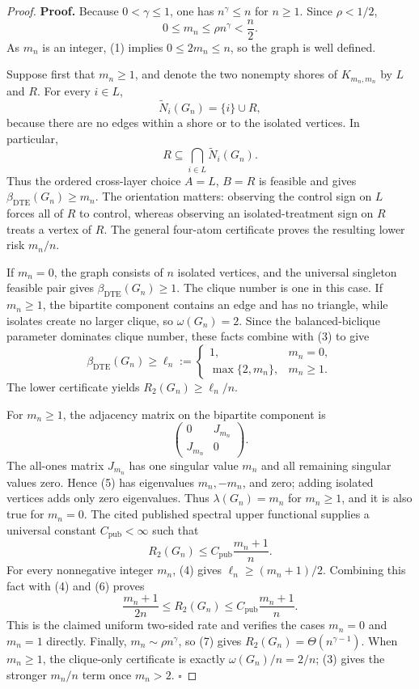 \documentclass{article}
\begin{document}
\begin{proof}
\textbf{Proof.}
Because \(0<\gamma\leq1\), one has \(n^{\gamma}\leq n\) for \(n\geq1\).  Since \(\rho<1/2\),
\[
0\leq m_n\leq\rho n^{\gamma}<\frac n2.
\tag{1}
\]
As \(m_n\) is an integer, (1) implies \(0\leq2m_n\leq n\), so the graph is well defined.

Suppose first that \(m_n\geq1\), and denote the two nonempty shores of \(K_{m_n,m_n}\) by \(L\) and \(R\).  For every \(i\in L\),
\[
\widetilde N_i(G_n)=\{i\}\cup R,
\tag{2}
\]
because there are no edges within a shore or to the isolated vertices.  In particular,
\[
R\subseteq\bigcap_{i\in L}\widetilde N_i(G_n).
\tag{3}
\]
Thus the ordered cross-layer choice \(A=L\), \(B=R\) is feasible and gives \(\beta_{\mathrm{DTE}}(G_n)\geq m_n\).  The orientation matters: observing the control sign on \(L\) forces all of \(R\) to control, whereas observing an isolated-treatment sign on \(R\) treats a vertex of \(R\).  The general four-atom certificate proves the resulting lower risk \(m_n/n\).

If \(m_n=0\), the graph consists of \(n\) isolated vertices, and the universal singleton feasible pair gives \(\beta_{\mathrm{DTE}}(G_n)\geq1\).  The clique number is one in this case.  If \(m_n\geq1\), the bipartite component contains an edge and has no triangle, while isolates create no larger clique, so \(\omega(G_n)=2\).  Since the balanced-biclique parameter dominates clique number, these facts combine with (3) to give
\[
\beta_{\mathrm{DTE}}(G_n)\geq
\ell_n:=
\begin{cases}
1,&m_n=0,\\
\max\{2,m_n\},&m_n\geq1.
\end{cases}
\tag{4}
\]
The lower certificate yields \(R_2(G_n)\geq\ell_n/n\).

For \(m_n\geq1\), the adjacency matrix on the bipartite component is
\[
\begin{pmatrix}0&J_{m_n}\\J_{m_n}&0\end{pmatrix}.
\tag{5}
\]
The all-ones matrix \(J_{m_n}\) has one singular value \(m_n\) and all remaining singular values zero.  Hence (5) has eigenvalues \(m_n,-m_n\), and zero; adding isolated vertices adds only zero eigenvalues.  Thus \(\lambda(G_n)=m_n\) for \(m_n\geq1\), and it is also true for \(m_n=0\).  The cited published spectral upper functional supplies a universal constant \(C_{\mathrm{pub}}<\infty\) such that
\[
R_2(G_n)\leq C_{\mathrm{pub}}\frac{m_n+1}{n}.
\tag{6}
\]
For every nonnegative integer \(m_n\), (4) gives \(\ell_n\geq(m_n+1)/2\).  Combining this fact with (4) and (6) proves
\[
\frac{m_n+1}{2n}\leq R_2(G_n)
\leq C_{\mathrm{pub}}\frac{m_n+1}{n}.
\tag{7}
\]
This is the claimed uniform two-sided rate and verifies the cases \(m_n=0\) and \(m_n=1\) directly.  Finally, \(m_n\sim\rho n^{\gamma}\), so (7) gives \(R_2(G_n)=\Theta(n^{\gamma-1})\).  When \(m_n\geq1\), the clique-only certificate is exactly \(\omega(G_n)/n=2/n\); (3) gives the stronger \(m_n/n\) term once \(m_n>2\). \(\square\)
\end{proof}
\end{document}
